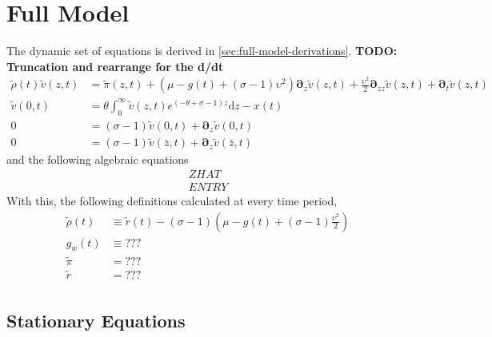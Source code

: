 \documentclass[11pt]{article}
\newcommand{\D}[1][]{\ensuremath{\boldsymbol{\partial}_{#1}}}
\newcommand{\diff}{\ensuremath{\mathrm{d}}}
\begin{document}

\section{Full Model}
The dynamic set of equations is derived in \cref{sec:full-model-derivations}. \textbf{TODO: Truncation and rearrange for the d/dt}
\begin{align}
	\tilde{\rho}(t) \tilde{v}(z,t) &= \tilde{\pi}(z,t) + (\mu - g(t) + (\sigma - 1)\upsilon^2)\D[z]\tilde{v}(z,t) + \frac{\upsilon^2}{2}\D[zz]\tilde{v}(z,t) + \D[t]\tilde{v}(z,t)\\
	\tilde{v}(0,t) &= \theta \int_{0}^{\infty}\tilde{v}(z,t) e^{(-\theta + \sigma - 1)z} \diff z - x(t)\label{eq:normalized-vm-summary-rescaled}\\
	0 &= (\sigma - 1)\tilde{v}(0,t) + \D[z] \tilde{v}(0,t)\label{eq:normalized-sp-summary-rescaled}\\
	0 &= (\sigma - 1)\tilde{v}(\bar{z},t) + \D[z] \tilde{v}(\bar{z},t)\label{eq:normalized-rhs-summary-rescaled}	
\end{align}
and the following algebraic equations
\begin{align}
	ZHAT\\
	ENTRY
\end{align}
With this, the following definitions calculated at every time period,
\begin{align}
	\tilde{\rho}(t) &\equiv \tilde{r}(t) - (\sigma - 1)\left(\mu - g(t) + (\sigma - 1)\frac{\upsilon^2}{2} \right)\label{eq:rhot}\\
	g_w(t) &\equiv ???\\
	\tilde{\pi} &= ???\\
	\tilde{r} &= ???\\\
\end{align}

\subsection{Stationary Equations}
\end{document}
